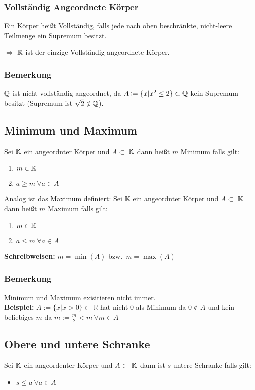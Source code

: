 \subsubsection{Vollständig Angeordnete Körper}
Ein Körper heißt Vollständig, falls jede nach oben beschränkte, nicht-leere
Teilmenge ein Supremum besitzt.

$\Rightarrow$ $\mathbb{R}$ ist der einzige Vollständig angeordnete Körper.

\subsubsection{Bemerkung} $\mathbb{Q}$ ist nicht vollständig angeordnet, da
$A := \{x | x^2 \leq 2\} \subset \mathbb{Q}$ kein Supremum besitzt
(Supremum ist $\sqrt{2} \notin \mathbb{Q}$).


\subsection{Minimum und Maximum}
Sei $\mathbb{K}$ ein angeordnter Körper und $A \subset$ $\mathbb{K}$ dann heißt
$m$ Minimum falls gilt:
\begin{enumerate}
    \item $m \in \mathbb{K}$
    \item $a \geq m\ \forall a \in A$
\end{enumerate}
Analog ist das Maximum definiert:
Sei $\mathbb{K}$ ein angeordnter Körper und $A \subset$ $\mathbb{K}$ dann heißt
$m$ Maximum falls gilt:
\begin{enumerate}
    \item $m \in \mathbb{K}$
    \item $a \leq m\ \forall a \in A$
\end{enumerate}
\textbf{Schreibweisen:}
$m = \min{(A)}$ bzw.\ $m = \max{(A)}$\\
\subsubsection{Bemerkung}
Minimum und Maximum exisitieren nicht immer.\\
\textbf{Beispiel:} $A := \{x | x>0\}\subset\ \mathbb{R}$
hat nicht 0 als Minimum da $0 \notin A$ und kein beliebiges $m$ da $\tilde{m} := \frac{m}{2} < m\ \forall m \in A$

\subsection{Obere und untere Schranke}
Sei $\mathbb{K}$ ein angeordenter Körper und $A \subset$ $\mathbb{K}$ dann ist $s$ untere
Schranke falls gilt:
\begin{itemize}
    \item $s \leq a\ \forall a \in A$
\end{itemize}

